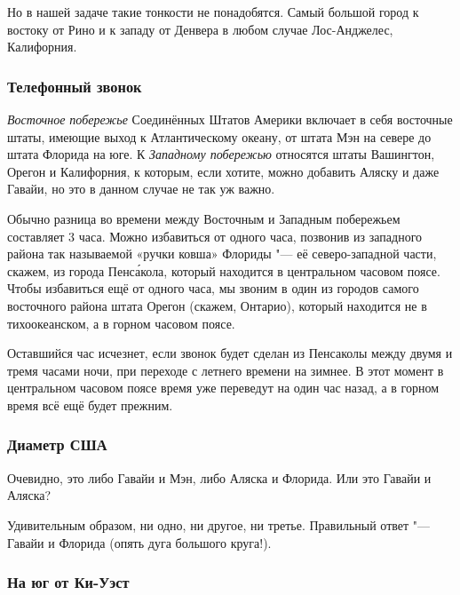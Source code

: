 \documentclass[twoside]{book}
\begin{document}
\medskip

Но в нашей задаче такие тонкости не понадобятся.
Самый большой город к востоку от Рино и к западу от Денвера в любом случае Лос-Анджелес, Калифорния.
\heart

\subsubsection*{Телефонный звонок}%

\emph{Восточное побережье} Соединённых Штатов Америки включает в себя восточные штаты, имеющие выход к Атлантическому океану, от штата Мэн на севере до штата Флорида на юге.
К \emph{Западному побережью} относятся штаты Вашингтон, Орегон и Калифорния,
к которым, если хотите, можно добавить Аляску и даже Гавайи, но это в данном случае не так уж важно. %

Обычно разница во времени между Восточным и Западным побережьем составляет 3 часа.
Можно избавиться от одного часа, позвонив из западного района так называемой «ручки ковша» Флориды "--- её северо-западной части, %
скажем, из города Пенс\'{а}кола, который находится в центральном часовом поясе.
Чтобы избавиться ещё от одного часа, мы звоним в один из городов
самого восточного района штата Орегон (скажем, Онтарио), который
находится не в тихоокеанском, а в горном часовом поясе.

Оставшийся час исчезнет, если звонок будет сделан из Пенсаколы между двумя и тремя часами ночи, при переходе с летнего времени на зимнее.
В этот момент в центральном часовом поясе время уже переведут на один
час назад, а в горном время всё ещё будет прежним.\heart 

\subsubsection*{Диаметр США}%

Очевидно, это либо Гавайи и Мэн, либо Аляска и Флорида.
Или это Гавайи и Аляска?

\medskip

Удивительным образом, ни одно, ни другое, ни третье.
Правильный ответ "--- Гавайи и Флорида (опять дуга большого круга!).\heart

\subsubsection*{На юг от Ки-Уэст}%
\end{document}
